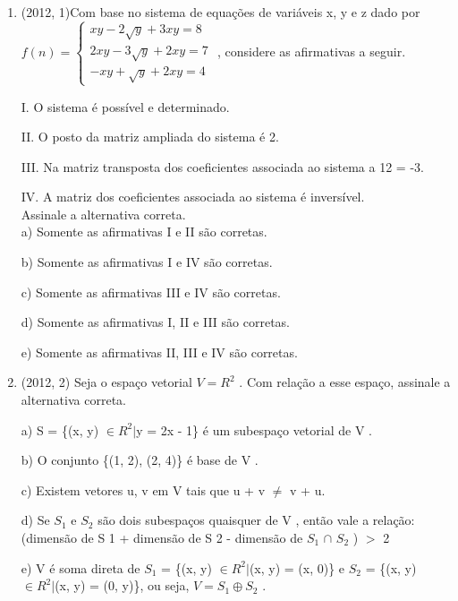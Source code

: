 \documentclass{article}
\begin{document}
\begin{enumerate}
\item(2012, 1)Com base no sistema de equações de variáveis x, y e z dado por
$
f(n) = \left \{ \begin{matrix} 
    xy -2\sqrt{y} + 3xy =8\\
    2xy -3\sqrt{y} + 2xy =7\\
    -xy +\sqrt{y} + 2xy =4
\end{matrix} \right.$ , considere as afirmativas a seguir.
 
I. O sistema é possível e determinado.

II. O posto da matriz ampliada do sistema é 2.

III. Na matriz transposta dos coeficientes associada ao sistema a 12 = -3.

IV. A matriz dos coeficientes associada ao sistema é inversível.\\

Assinale a alternativa correta.\\

a) Somente as afirmativas I e II são corretas.

b) Somente as afirmativas I e IV são corretas.

c) Somente as afirmativas III e IV são corretas.

d) Somente as afirmativas I, II e III são corretas.

e) Somente as afirmativas II, III e IV são corretas.\newline






\item(2012, 2) Seja o espaço vetorial $V = R^2$ . Com relação a esse espaço, assinale a alternativa correta.

a) S = \{(x, y) $\in R^2 |$y = 2x - 1\} é um subespaço vetorial de V .

b) O conjunto \{(1, 2), (2, 4)\} é base de V .

c) Existem vetores u, v em V tais que u + v $\ne$ v + u.

d) Se $S_1$ e $S_2$ são dois subespaços quaisquer de V , então vale a relação: (dimensão de S 1 + dimensão de S 2 - dimensão de $S_1$ $\cap$  $S_2$ ) $>$ 2

e) V é soma direta de $S_1$ = \{(x, y) $\in R^2 |$(x, y) = (x, 0)\} e $S_2$ = \{(x, y) $\in R^2 |$(x, y) = (0, y)\}, ou seja, $V = S_1 \oplus S_2$ .\newline






\end{enumerate}
\end{document}
